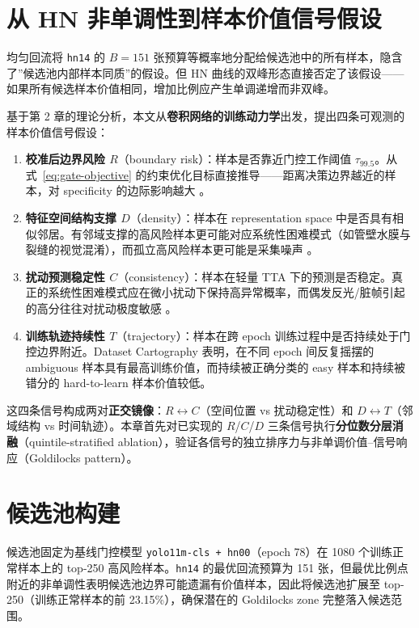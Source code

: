 \documentclass[UTF8,openany,12pt]{ctexbook}
\begin{document}
\section{从 HN 非单调性到样本价值信号假设}

均匀回流将 \texttt{hn14} 的 $B=151$ 张预算等概率地分配给候选池中的所有样本，隐含了”候选池内部样本同质”的假设。但 HN 曲线的双峰形态直接否定了该假设——如果所有候选样本价值相同，增加比例应产生单调递增而非双峰。

基于第 2 章的理论分析，本文从\textbf{卷积网络的训练动力学}出发，提出四条可观测的样本价值信号假设：

\begin{enumerate}[leftmargin=2em,nosep]
\item \textbf{校准后边界风险 $R$}（boundary risk）：样本是否靠近门控工作阈值 $\tau_{99.5}$。从式~\eqref{eq:gate-objective} 的约束优化目标直接推导——距离决策边界越近的样本，对 specificity 的边际影响越大 \cite{guo2017calibration,kumar2021constrained}。
\item \textbf{特征空间结构支撑 $D$}（density）：样本在 representation space 中是否具有相似邻居。有邻域支撑的高风险样本更可能对应系统性困难模式（如管壁水膜与裂缝的视觉混淆），而孤立高风险样本更可能是采集噪声 \cite{kim2024structural}。
\item \textbf{扰动预测稳定性 $C$}（consistency）：样本在轻量 TTA 下的预测是否稳定。真正的系统性困难模式应在微小扰动下保持高异常概率，而偶发反光/脏帧引起的高分往往对扰动极度敏感 \cite{wu2022entropy}。
\item \textbf{训练轨迹持续性 $T$}（trajectory）：样本在跨 epoch 训练过程中是否持续处于门控边界附近。Dataset Cartography \cite{swayamdipta2020cartography} 表明，在不同 epoch 间反复摇摆的 ambiguous 样本具有最高训练价值，而持续被正确分类的 easy 样本和持续被错分的 hard-to-learn 样本价值较低。
\end{enumerate}

\noindent 这四条信号构成两对\textbf{正交镜像}：$R \leftrightarrow C$（空间位置 vs 扰动稳定性）和 $D \leftrightarrow T$（邻域结构 vs 时间轨迹）。本章首先对已实现的 $R$/$C$/$D$ 三条信号执行\textbf{分位数分层消融}（quintile-stratified ablation），验证各信号的独立排序力与非单调价值--信号响应（Goldilocks pattern）。

\section{候选池构建}

候选池固定为基线门控模型 \texttt{yolo11m-cls + hn00}（epoch 78）在 1080 个训练正常样本上的 top-250 高风险样本。\texttt{hn14} 的最优回流预算为 151 张，但最优比例点附近的非单调性表明候选池边界可能遗漏有价值样本，因此将候选池扩展至 top-250（训练正常样本的前 23.15\%），确保潜在的 Goldilocks zone 完整落入候选范围。
\end{document}
